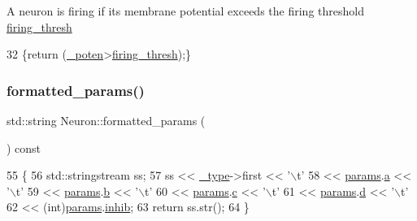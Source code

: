 A neuron is firing if its membrane potential exceeds the firing threshold \hyperlink{classNeuron_a9173cec15070307b635e58f976113ad7}{firing\+\_\+thresh} 
\begin{DoxyCode}
32 \{\textcolor{keywordflow}{return} (\hyperlink{classNeuron_a7f7fdc3f9550b870351c60f618c11376}{\_poten}>\hyperlink{classNeuron_a9173cec15070307b635e58f976113ad7}{firing\_thresh});\}
\end{DoxyCode}
\mbox{\label{classNeuron_a24dc0979745c7e25cfa997d88d973896}} 
\subsubsection{\texorpdfstring{formatted\+\_\+params()}{formatted\_params()}}
{\footnotesize\ttfamily std\+::string Neuron\+::formatted\+\_\+params (\begin{DoxyParamCaption}{ }\end{DoxyParamCaption}) const}


\begin{DoxyCode}
55                                          \{
56     std::stringstream ss;
57     ss << \hyperlink{classNeuron_af48de7c2ad739fc5d57bfa2f3b1f7663}{\_type}->first << \textcolor{charliteral}{'\(\backslash\)t'}
58        << \hyperlink{classNeuron_a9427965b6669c7c35c327689de7a4d63}{params}.\hyperlink{structNeuronParams_a359703733f5e70bbd67d019e45a3bc85}{a} << \textcolor{charliteral}{'\(\backslash\)t'}
59        << \hyperlink{classNeuron_a9427965b6669c7c35c327689de7a4d63}{params}.\hyperlink{structNeuronParams_abd1bd37179d8efa115a8749f9252f77d}{b} << \textcolor{charliteral}{'\(\backslash\)t'}
60        << \hyperlink{classNeuron_a9427965b6669c7c35c327689de7a4d63}{params}.\hyperlink{structNeuronParams_a5df2ced2526eb84af2c8d2d34d9bfd93}{c} << \textcolor{charliteral}{'\(\backslash\)t'}
61        << \hyperlink{classNeuron_a9427965b6669c7c35c327689de7a4d63}{params}.\hyperlink{structNeuronParams_af2bd3bad3bc5532186cdc8d056a10cfb}{d} << \textcolor{charliteral}{'\(\backslash\)t'}
62        << (int)\hyperlink{classNeuron_a9427965b6669c7c35c327689de7a4d63}{params}.\hyperlink{structNeuronParams_a751856d77a821cbd361b774d8653bbe6}{inhib};
63     \textcolor{keywordflow}{return} ss.str();
64 \}
\end{DoxyCode}
\mbox{\label{classNeuron_aa1c46c99ed3e1a349b5e0ee82aec3026}} 
